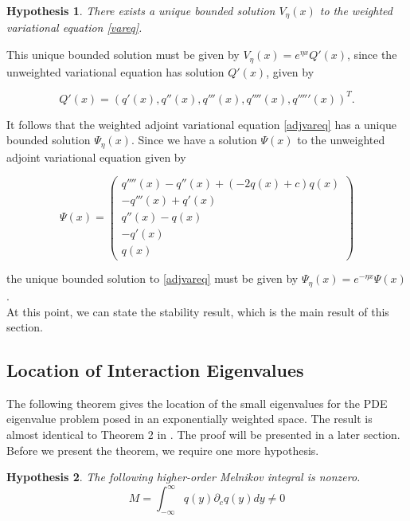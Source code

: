 \documentclass[12pt]{article}
\newtheorem{hypothesis}{Hypothesis}
\begin{document}
\begin{hypothesis}\label{uniquevar}
There exists a unique bounded solution $V_\eta(x)$ to the weighted variational equation \eqref{vareq}.
\end{hypothesis}

This unique bounded solution must be given by $V_\eta(x) = e^{\eta x} Q'(x)$, since the unweighted variational equation has solution $Q'(x)$, given by

\begin{equation}
Q'(x) = (q'(x), q''(x), q'''(x), q''''(x), q'''''(x))^T.
\end{equation}

It follows that the weighted adjoint variational equation \eqref{adjvareq} has a unique bounded solution $\Psi_\eta(x)$. Since we have a solution $\Psi(x)$ to the unweighted adjoint variational equation given by

\begin{equation}\label{Psi}
\Psi(x) = \begin{pmatrix}
q''''(x) - q''(x) + (-2q(x) + c)q(x)\\
-q'''(x) + q'(x) \\
q''(x) - q(x) \\
-q'(x) \\
q(x)
\end{pmatrix}
\end{equation}

the unique bounded solution to \eqref{adjvareq} must be given by $\Psi_\eta(x) = e^{-\eta x}\Psi(x)$.\\

At this point, we can state the stability result, which is the main result of this section.

\subsection{Location of Interaction Eigenvalues}

The following theorem gives the location of the small eigenvalues for the PDE eigenvalue problem posed in an exponentially weighted space. The result is almost identical to Theorem 2 in \cite{Sandstede1998}. The proof will be presented in a later section. Before we present the theorem, we require one more hypothesis.

\begin{hypothesis}\label{Melnikovnonzero}
The following higher-order Melnikov integral is nonzero.
\begin{equation}\label{Melnikov2}
M = \int_{-\infty}^{\infty} q(y) \partial_c q(y) dy \neq 0
\end{equation}
\end{hypothesis}
\end{document}
